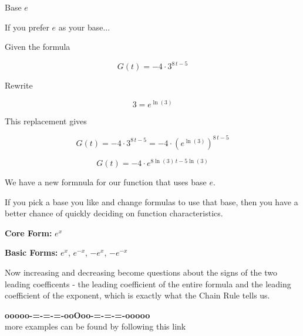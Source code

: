 \documentclass{ximera}
\begin{document}
\begin{example} Base $e$

If you prefer $e$ as your base...


Given the formula 

\[
G(t) = -4 \cdot 3^{8 \, t - 5}
\]



Rewrite 

\[
3 = e^{\ln(3)}
\]


This replacement gives 



\[
G(t) = -4 \cdot 3^{8 \, t - 5} = -4 \cdot \left( e^{\ln(3)} \right)^{8 \, t - 5}
\]

\[
G(t) = -4 \cdot e^{8 \ln(3) \, t - 5 \ln(3)}
\]


We have a new formnula for our function that uses base $e$.


\end{example}




If you pick a base you like and change formulas to use that base, then you have a better chance of quickly deciding on function characteristics. 



\textbf{\textcolor{blue!55!black}{Core Form:}}  $e^x$ 



\textbf{\textcolor{blue!55!black}{Basic Forms:}}  $e^x$, $e^{-x}$, $-e^x$, $-e^{-x}$ 


Now increasing and decreasing become questions about the signs of the two leading coefficents - the leading coefficient of the entire formula and the leading coefficient of the exponent, which is exactly what the Chain Rule tells us.














\begin{center}
\textbf{\textcolor{green!50!black}{ooooo-=-=-=-ooOoo-=-=-=-ooooo}} \\

more examples can be found by following this link\\ 

\end{center}
\end{document}
